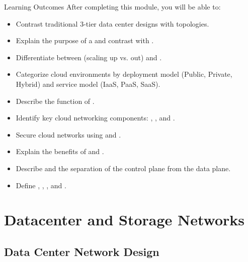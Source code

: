 \documentclass[aspectratio=169]{beamer}  %
\begin{document}
\begin{frame}[t,allowframebreaks]{Learning Outcomes}
    After completing this module, you will be able to:
    \vspace{0.4em}
    \begin{itemize}
        \item Contrast traditional 3-tier data center designs with  topologies.
        \item Explain the purpose of a  and contrast  with .
        \item Differentiate between  (scaling up vs. out) and .
        \item Categorize cloud environments by deployment model (Public, Private, Hybrid) and service model (IaaS, PaaS, SaaS).
        \item Describe the function of .
        \item Identify key cloud networking components: , , and .
        \item Secure cloud networks using  and .
        \item Explain the benefits of  and .
        \item Describe  and the separation of the control plane from the data plane.
        \item Define , , , and .
    \end{itemize}
\end{frame}

\section{Datacenter and Storage Networks}
\subsection{Data Center Network Design}
\end{document}
